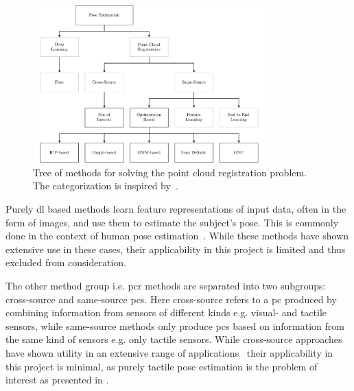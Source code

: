 \begin{figure}[h]
	\begin{small}
		\begin{center}
			\includegraphics[width=0.8\textwidth]{chapters/state-of-the-art/fig/pe-categories-v2.pdf}
		\end{center}
		\caption{Tree of methods for solving the point cloud registration problem. The categorization is inspired by~\cite{a-comprehensive-survey-on-point-cloud-registration}.}
		\label{fig:pe-categories}
	\end{small}
\end{figure}

Purely \gls{dl} based methods learn feature representations of input data, often in the form of images, and use them to estimate the subject's pose. This is commonly done in the context of human pose estimation~\cite{hands-deep-in-deep-learning-for-hand-pose-estimation, deeppose:-human-pose-estimation-via-deep-neural-networks, deeplabcut:-markerless-pose-estimation-of-user-defined-body-parts-with-deep-learning}. While these methods have shown extensive use in these cases, their applicability in this project is limited and thus excluded from consideration. \medskip

The other method group i.e. \gls{pcr} methods are separated into two subgroups: cross-source and same-source \gls{pc}s. Here cross-source refers to a \gls{pc} produced by combining information from sensors of different kinds e.g. visual- and tactile sensors, while same-source methods only produce \gls{pc}s based on information from the same kind of sensors e.g. only tactile sensors. 
While cross-source approaches have shown utility in an extensive range of applications~\cite{a-systematic-approach-for-cross-source-point-cloud-registration-by-preserving-macro-and-micro-structures,a-coarse-to-fine-algorithm-for-matching-and-registration-in-3d-cross-source-point-clouds,a-comprehensive-survey-on-point-cloud-registration} their applicability in this project is minimal, as purely tactile pose estimation is the problem of interest as presented in . \medskip


